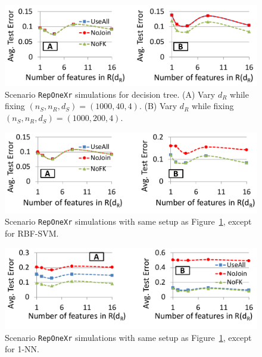 \documentclass{vldb}
\begin{document}
\begin{figure}[t]
\centering
\includegraphics[width=0.99\linewidth]{onexr_jerrydt.pdf}
\caption{Scenario \texttt{RepOneXr} simulations for decision tree. (A) Vary $d_R$ while fixing $(n_S, n_R, d_S) = (1000, 40, 4)$. 
(B) Vary $d_R$ while fixing $(n_S, n_R, d_S) = (1000, 200, 4)$.}
\label{Figure:OneXrjerry_dt}
\end{figure}

\begin{figure}[t]
\centering
\includegraphics[width=0.99\linewidth]{onexr_jerrysvm.pdf}
\caption{Scenario \texttt{RepOneXr} simulations with same setup as Figure~\ref{Figure:OneXrjerry_dt}, except for RBF-SVM.}
\label{Figure:OneXrjerry_svm}
\end{figure}

\begin{figure}[t]
\centering
\includegraphics[width=0.99\linewidth]{onexr_jerry1nn.pdf}
\caption{Scenario \texttt{RepOneXr} simulations with same setup as Figure~\ref{Figure:OneXrjerry_dt}, except for 1-NN.}
\label{Figure:OneXrjerry_1nn}
\end{figure}
\end{document}
